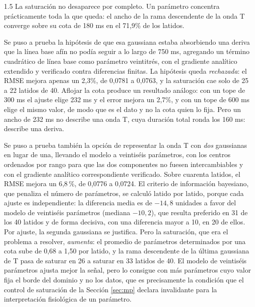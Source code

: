 \begin{spacing}{1.5}
La saturación no desaparece por completo. Un parámetro concentra prácticamente toda la que queda: el ancho de la rama descendente de la onda T converge sobre su cota de 180 ms en el 71,9\% de los latidos.

Se puso a prueba la hipótesis de que esa gaussiana estaba absorbiendo una deriva que la línea base afín no podía seguir a lo largo de 750 ms, agregando un término cuadrático de línea base como parámetro veintitrés, con el gradiente analítico extendido y verificado contra diferencias finitas. La hipótesis queda \emph{rechazada}: el RMSE mejora apenas un 2,3\%, de 0,0781 a 0,0763, y la saturación cae solo de 25 a 22 latidos de 40. Aflojar la cota produce un resultado análogo: con un tope de 300 ms el ajuste elige 232 ms y el error mejora un 2,7\%, y con un tope de 600 ms elige el mismo valor, de modo que es el dato y no la cota quien lo fija. Pero un ancho de 232 ms no describe una onda T, cuya duración total ronda los 160 ms: describe una deriva.

Se puso a prueba también la opción de representar la onda T con \emph{dos} gaussianas en lugar de una, llevando el modelo a veintiséis parámetros, con los centros ordenados por rango para que las dos componentes no fuesen intercambiables y con el gradiente analítico correspondiente verificado. Sobre cuarenta latidos, el RMSE mejora un 6,8\,\%, de 0,0776 a 0,0724. El criterio de información bayesiano, que penaliza el número de parámetros, se calculó latido por latido, porque cada ajuste es independiente: la diferencia media es de $-14{,}8$ unidades a favor del modelo de veintiséis parámetros (mediana $-10{,}2$), que resulta preferido en 31 de los 40 latidos y de forma decisiva, con una diferencia mayor a 10, en 20 de ellos. Por ajuste, la segunda gaussiana se justifica. Pero la saturación, que era el problema a resolver, \emph{aumenta}: el promedio de parámetros determinados por una cota sube de 0,68 a 1,50 por latido, y la rama descendente de la última gaussiana de T pasa de saturar en 26 a saturar en 33 latidos de 40. El modelo de veintiséis parámetros ajusta mejor la señal, pero lo consigue con más parámetros cuyo valor fija el borde del dominio y no los datos, que es precisamente la condición que el control de saturación de la Sección \ref{sec:mp} declara invalidante para la interpretación fisiológica de un parámetro.


\end{spacing}
